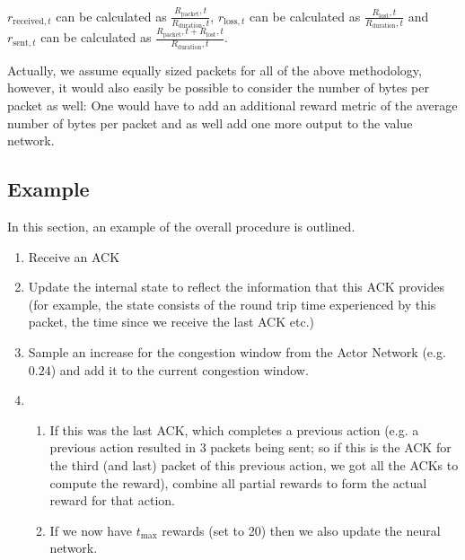 \documentclass[sigconf]{acmart}
\begin{document}
$r_{\text{received},t}$ can be calculated as $\frac{R_\text{packet},t}{R_\text{duration},t}$, $r_{\text{loss},t}$ can be calculated as $\frac{R_\text{lost},t}{R_\text{duration},t}$ and $r_{\text{sent},t}$ can be calculated as $\frac{{R_\text{packet},t} + {R_\text{lost},t}}{R_\text{duration},t}$.

Actually, we assume equally sized packets for all of the above methodology, however, it would also easily be possible to consider the number of bytes per packet as well: One would have to add an additional reward metric of the average number of bytes per packet and as well add one more output to the value network. 

\subsection{Example}

In this section, an example of the overall procedure is outlined. 

\begin{enumerate}
\item Receive an ACK
\item Update the internal state to reflect the information that this ACK provides (for example, the state consists of the round trip time experienced by this packet, the time since we receive the last ACK etc.)
\item Sample an increase for the congestion window from the Actor Network (e.g. $0.24$) and add it to the current congestion window.
\item 
\begin{enumerate}
\item If this was the last ACK, which completes a previous action (e.g. a previous action resulted in $3$ packets being sent; so if this is the ACK for the third (and last) packet of this previous action, we got all the ACKs to compute the reward), combine all partial rewards to form the actual reward for that action. 
\item If we now have $t_\text{max}$ rewards (set to 20) then we also update the neural network. 
\end{enumerate}

\end{enumerate}
\end{document}
